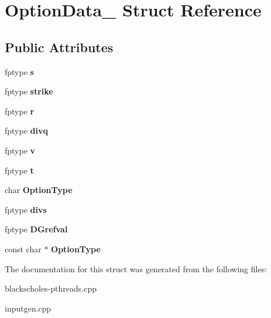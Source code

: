 \hypertarget{structOptionData__}{\section{Option\-Data\-\_\- Struct Reference}
\label{structOptionData__}
}
\subsection*{Public Attributes}
\begin{DoxyCompactItemize}
\item 
\hypertarget{structOptionData___a03608e30f5088a4d48ef987f9edf5c8b}{fptype {\bfseries s}}\label{structOptionData___a03608e30f5088a4d48ef987f9edf5c8b}

\item 
\hypertarget{structOptionData___a5b152fd22ac51a13a606f612f5d06601}{fptype {\bfseries strike}}\label{structOptionData___a5b152fd22ac51a13a606f612f5d06601}

\item 
\hypertarget{structOptionData___a1f58ec5153540c86adf0cd85ed4c511b}{fptype {\bfseries r}}\label{structOptionData___a1f58ec5153540c86adf0cd85ed4c511b}

\item 
\hypertarget{structOptionData___a937efdc3f50f5a078ba12382a428169c}{fptype {\bfseries divq}}\label{structOptionData___a937efdc3f50f5a078ba12382a428169c}

\item 
\hypertarget{structOptionData___ad9537c06137b0942e9a3ae3b4938b805}{fptype {\bfseries v}}\label{structOptionData___ad9537c06137b0942e9a3ae3b4938b805}

\item 
\hypertarget{structOptionData___a9f62c9f8a0ff69d5ea77abe0c8d2a67c}{fptype {\bfseries t}}\label{structOptionData___a9f62c9f8a0ff69d5ea77abe0c8d2a67c}

\item 
\hypertarget{structOptionData___a864328f0abdcc2405010ae6f7f45285a}{char {\bfseries Option\-Type}}\label{structOptionData___a864328f0abdcc2405010ae6f7f45285a}

\item 
\hypertarget{structOptionData___a8725d4f0d710f5a3422c100cb6dd981a}{fptype {\bfseries divs}}\label{structOptionData___a8725d4f0d710f5a3422c100cb6dd981a}

\item 
\hypertarget{structOptionData___a96ff92b00034507fd4b90863b16ad96b}{fptype {\bfseries D\-Grefval}}\label{structOptionData___a96ff92b00034507fd4b90863b16ad96b}

\item 
\hypertarget{structOptionData___a0713613ef4810f886311a63277af8ba4}{const char $\ast$ {\bfseries Option\-Type}}\label{structOptionData___a0713613ef4810f886311a63277af8ba4}

\end{DoxyCompactItemize}


The documentation for this struct was generated from the following files\-:\begin{DoxyCompactItemize}
\item 
blackscholes-\/pthreads.\-cpp\item 
inputgen.\-cpp\end{DoxyCompactItemize}

